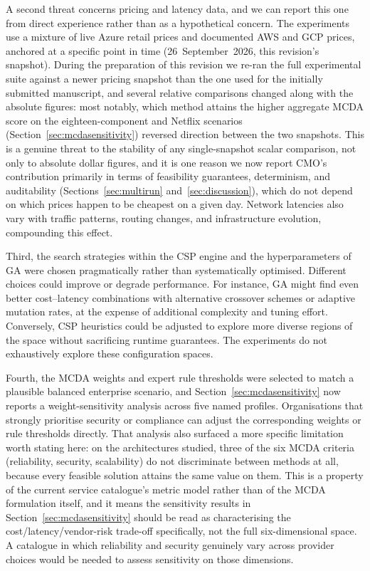 \documentclass[journal]{IEEEtran}
\newcommand{\cmo}{CMO\xspace}
\begin{document}
A second threat concerns pricing and latency data, and we can report this one
from direct experience rather than as a hypothetical concern. The experiments
use a mixture of live Azure retail prices and documented AWS and GCP prices,
anchored at a specific point in time (26~September~2026, this revision's
snapshot). During the preparation of this revision we re-ran the full
experimental suite against a newer pricing snapshot than the one used for the
initially submitted manuscript, and several relative comparisons changed
along with the absolute figures: most notably, which method attains the
higher aggregate MCDA score on the eighteen-component and Netflix scenarios
(Section~\ref{sec:mcdasensitivity}) reversed direction between the two
snapshots. This is a genuine threat to the stability of any single-snapshot
scalar comparison, not only to absolute dollar figures, and it is one reason
we now report \cmo's contribution primarily in terms of feasibility
guarantees, determinism, and auditability (Sections~\ref{sec:multirun}
and~\ref{sec:discussion}), which do not depend on which prices happen to be
cheapest on a given day. Network latencies also vary with traffic patterns,
routing changes, and infrastructure evolution, compounding this effect.

Third, the search strategies within the CSP engine and the hyperparameters of
GA were chosen pragmatically rather than systematically optimised. Different choices could improve or degrade performance. For instance,
GA might find even better cost--latency combinations with alternative crossover
schemes or adaptive mutation rates, at the expense of additional complexity and
tuning effort. Conversely, CSP heuristics could be adjusted to explore more
diverse regions of the space without sacrificing runtime guarantees. The
experiments do not exhaustively explore these configuration spaces.

Fourth, the MCDA weights and expert rule thresholds were selected to match a
plausible balanced enterprise scenario, and Section~\ref{sec:mcdasensitivity}
now reports a weight-sensitivity analysis across five named profiles.
Organisations that strongly prioritise security or compliance can adjust the
corresponding weights or rule thresholds directly. That analysis also
surfaced a more specific limitation worth stating here: on the architectures
studied, three of the six MCDA criteria (reliability, security, scalability)
do not discriminate between methods at all, because every feasible solution
attains the same value on them. This is a property of the current service
catalogue's metric model rather than of the MCDA formulation itself, and it
means the sensitivity results in Section~\ref{sec:mcdasensitivity} should be
read as characterising the cost/latency/vendor-risk trade-off specifically,
not the full six-dimensional space. A catalogue in which reliability and
security genuinely vary across provider choices would be needed to assess
sensitivity on those dimensions.
\end{document}
